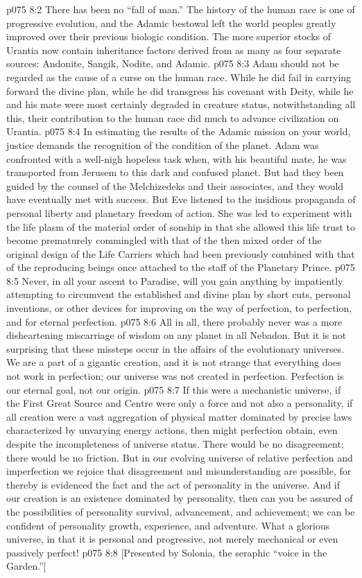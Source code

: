 \vs p075 8:2 There has been no “fall of man.” The history of the human race is one of progressive evolution, and the Adamic bestowal left the world peoples greatly improved over their previous biologic condition. The more superior stocks of Urantia now contain inheritance factors derived from as many as four separate sources: Andonite, Sangik, Nodite, and Adamic.
\vs p075 8:3 Adam should not be regarded as the cause of a curse on the human race. While he did fail in carrying forward the divine plan, while he did transgress his covenant with Deity, while he and his mate were most certainly degraded in creature status, notwithstanding all this, their contribution to the human race did much to advance civilization on Urantia.
\vs p075 8:4 \pc In estimating the results of the Adamic mission on your world, justice demands the recognition of the condition of the planet. Adam was confronted with a well\hyp{}nigh hopeless task when, with his beautiful mate, he was transported from Jerusem to this dark and confused planet. But had they been guided by the counsel of the Melchizedeks and their associates, and  they would have eventually met with success. But Eve listened to the insidious propaganda of personal liberty and planetary freedom of action. She was led to experiment with the life plasm of the material order of sonship in that she allowed this life trust to become prematurely commingled with that of the then mixed order of the original design of the Life Carriers which had been previously combined with that of the reproducing beings once attached to the staff of the Planetary Prince.
\vs p075 8:5 Never, in all your ascent to Paradise, will you gain anything by impatiently attempting to circumvent the established and divine plan by short cuts, personal inventions, or other devices for improving on the way of perfection, to perfection, and for eternal perfection.
\vs p075 8:6 \pc All in all, there probably never was a more disheartening miscarriage of wisdom on any planet in all Nebadon. But it is not surprising that these missteps occur in the affairs of the evolutionary universes. We are a part of a gigantic creation, and it is not strange that everything does not work in perfection; our universe was not created in perfection. Perfection is our eternal goal, not our origin.
\vs p075 8:7 If this were a mechanistic universe, if the First Great Source and Centre were only a force and not also a personality, if all creation were a vast aggregation of physical matter dominated by precise laws characterized by unvarying energy actions, then might perfection obtain, even despite the incompleteness of universe status. There would be no disagreement; there would be no friction. But in our evolving universe of relative perfection and imperfection we rejoice that disagreement and misunderstanding are possible, for thereby is evidenced the fact and the act of personality in the universe. And if our creation is an existence dominated by personality, then can you be assured of the possibilities of personality survival, advancement, and achievement; we can be confident of personality growth, experience, and adventure. What a glorious universe, in that it is personal and progressive, not merely mechanical or even passively perfect!
\vsetoff
\vs p075 8:8 [Presented by Solonia, the seraphic “voice in the Garden.”]

